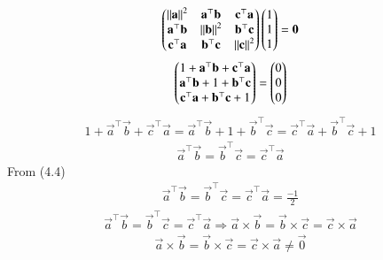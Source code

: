 \documentclass{beamer}
\begin{document}
\begin{frame}
\begin{align}
\begin{pmatrix}
\left\lVert\mathbf{a}\right\rVert^2 & \mathbf{a}^\top\mathbf{b} & \mathbf{c}^\top\mathbf{a} \\
\mathbf{a}^\top\mathbf{b} & \left\lVert\mathbf{b}\right\rVert^2 & \mathbf{b}^\top\mathbf{c} \\
\mathbf{c}^\top\mathbf{a} & \mathbf{b}^\top\mathbf{c} & \left\lVert\mathbf{c}\right\rVert^2 \end{pmatrix}
\begin{pmatrix}
1 \\ 1 \\ 1\end{pmatrix} = \mathbf{0}
\end{align}
\begin{align}
\begin{pmatrix}
1+\mathbf{a}^\top\mathbf{b}+\mathbf{c}^\top\mathbf{a} \\
\mathbf{a}^\top\mathbf{b}+1+\mathbf{b}^\top\mathbf{c} \\
\mathbf{c}^\top\mathbf{a}+\mathbf{b}^\top\mathbf{c}+1\end{pmatrix} = \begin{pmatrix}0 \\ 0 \\ 0\end{pmatrix}
\end{align}
\begin{align}
1+\vec{a}^\top\vec{b}+\vec{c}^\top\vec{a} = \vec{a}^\top\vec{b}+1+\vec{b}^\top\vec{c} = 
\vec{c}^\top\vec{a}+\vec{b}^\top\vec{c}+1
\end{align}
\begin{align}
\vec{a}^\top\vec{b} = \vec{b}^\top\vec{c} = \vec{c}^\top\vec{a} 
\end{align}
From (4.4)
\begin{align}
\vec{a}^\top\vec{b} = \vec{b}^\top\vec{c} = \vec{c}^\top\vec{a} = \frac{-1}{2}
\end{align}
\begin{align}
\vec{a}^\top\vec{b} = \vec{b}^\top\vec{c} = \vec{c}^\top\vec{a} \Longrightarrow \vec{a}\times\vec{b} = \vec{b}\times\vec{c} = \vec{c}\times\vec{a}
\end{align}
\begin{align}
\vec{a}\times\vec{b} = \vec{b}\times\vec{c} = \vec{c}\times\vec{a} \neq \vec{0}
\end{align}


\end{frame}
\end{document}
